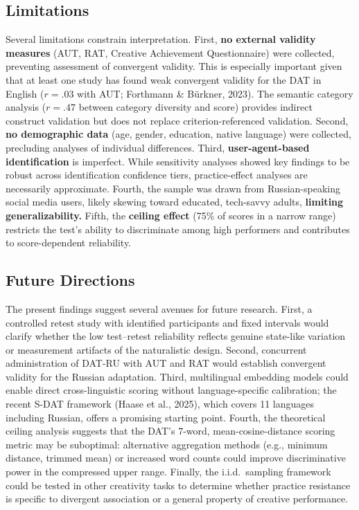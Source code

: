 \documentclass[12pt]{article}
\begin{document}
\subsection{Limitations}

Several limitations constrain interpretation. First, \textbf{no external validity measures} (AUT, RAT, Creative Achievement Questionnaire) were collected, preventing assessment of convergent validity. This is especially important given that at least one study has found weak convergent validity for the DAT in English ($r = .03$ with AUT; Forthmann \& B\"urkner, 2023). The semantic category analysis ($r = .47$ between category diversity and score) provides indirect construct validation but does not replace criterion-referenced validation. Second, \textbf{no demographic data} (age, gender, education, native language) were collected, precluding analyses of individual differences. Third, \textbf{user-agent-based identification} is imperfect. While sensitivity analyses showed key findings to be robust across identification confidence tiers, practice-effect analyses are necessarily approximate. Fourth, the sample was drawn from Russian-speaking social media users, likely skewing toward educated, tech-savvy adults, \textbf{limiting generalizability.} Fifth, the \textbf{ceiling effect} (75\% of scores in a narrow range) restricts the test's ability to discriminate among high performers and contributes to score-dependent reliability.

\subsection{Future Directions}

The present findings suggest several avenues for future research. First, a controlled retest study with identified participants and fixed intervals would clarify whether the low test--retest reliability reflects genuine state-like variation or measurement artifacts of the naturalistic design. Second, concurrent administration of DAT-RU with AUT and RAT would establish convergent validity for the Russian adaptation. Third, multilingual embedding models could enable direct cross-linguistic scoring without language-specific calibration; the recent S-DAT framework (Haase et al., 2025), which covers 11 languages including Russian, offers a promising starting point. Fourth, the theoretical ceiling analysis suggests that the DAT's 7-word, mean-cosine-distance scoring metric may be suboptimal: alternative aggregation methods (e.g., minimum distance, trimmed mean) or increased word counts could improve discriminative power in the compressed upper range. Finally, the i.i.d.\ sampling framework could be tested in other creativity tasks to determine whether practice resistance is specific to divergent association or a general property of creative performance.
\end{document}
